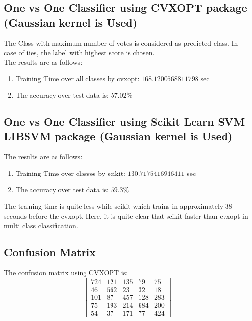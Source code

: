 \documentclass[11pt]{article}
\begin{document}
\subsection{One vs One Classifier using CVXOPT package (Gaussian kernel is Used)}
The Class with maximum number of votes is considered as predicted class. In case of ties, the label with highest score is chosen.\\
The results are as follows:
\begin{enumerate}
  \item Training Time over all classes by  cvxopt:  $168.1200668811798$ sec
  \item The accuracy over test data is:  $57.02 \%$
\end{enumerate}

\subsection{One vs One Classifier using Scikit Learn SVM LIBSVM package (Gaussian kernel is Used)}
The results are as follows:
\begin{enumerate}
  \item Training Time over classes by scikit:  $130.7175416946411$ sec
  \item The accuracy over test data is:  $59.3 \%$
\end{enumerate}
The training time is quite less while scikit which trains in approximately 38 seconds before the cvxopt. Here, it is quite clear that scikit faster than cvxopt in multi class classification.
\subsection{Confusion Matrix}
The confusion matrix using CVXOPT is:
\begin{equation}
  \begin{bmatrix}
    724 & 121 & 135 & 79 & 75\\
    46 & 562 & 23 & 32 & 18\\
    101 & 87 & 457 & 128 & 283\\
    75 & 193 & 214 & 684 & 200\\
    54 & 37 & 171 & 77 & 424
  \end{bmatrix}
\end{equation}
\\
\end{document}
